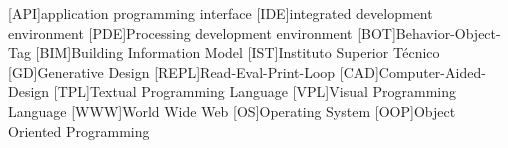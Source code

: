 \documentclass{./llncs2e/llncs}
\begin{document}
\newpage

\begin{acronym}
	[API]{application programming interface}
	[IDE]{integrated development environment}
	[PDE]{Processing development environment}
	[BOT]{Behavior-Object-Tag}
	[BIM]{Building Information Model}
	[IST]{Instituto Superior Técnico}
	[GD]{Generative Design}
	[REPL]{Read-Eval-Print-Loop}
	[CAD]{Computer-Aided-Design}
	[TPL]{Textual Programming Language}
	[VPL]{Visual Programming Language}
	[WWW]{World Wide Web}
	[OS]{Operating System}
	[OOP]{Object Oriented Programming}
\end{acronym}

% 
% 
 

 
\end{document}
